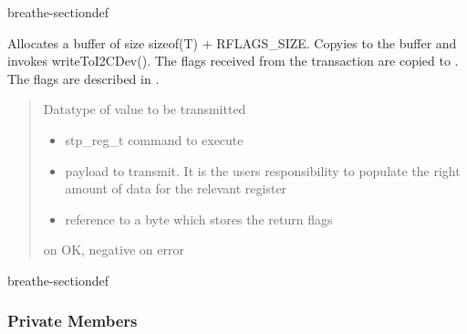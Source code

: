 \documentclass[letterpaper,10pt,english]{sphinxmanual}
\begin{document}
\begin{fulllineitems}
\begin{sphinxuseclass}{breathe-sectiondef}
\begin{fulllineitems}
\sphinxAtStartPar
Allocates a buffer of size sizeof(T) + RFLAGS\_SIZE. Copyies  to the buffer and invokes writeToI2CDev(). The flags received from the transaction are copied to . The flags are described in {\hyperref[\detokenize{code/bioscara_hardware_drivers/index:classbioscara__hardware__drivers_1_1Joint_1a81a8e4841ae03d04498d2f6ef3c08d82}]{}}.
\begin{quote}\begin{description}
\sphinxAtStartPar
{} \textendash{} Datatype of value to be transmitted 

\begin{itemize}
\item {} 
\sphinxAtStartPar
{} \textendash{} stp\_reg\_t command to execute 

\item {} 
\sphinxAtStartPar
{} \textendash{} payload to transmit. It is the users responsibility to populate the right amount of data for the relevant register 

\item {} 
\sphinxAtStartPar
{} \textendash{} reference to a byte which stores the return flags 

\end{itemize}

 on OK, negative on error 

\end{description}\end{quote}

\end{fulllineitems}


\end{sphinxuseclass}
\begin{sphinxuseclass}{breathe-sectiondef}\subsubsection*{Private Members}


\end{sphinxuseclass}
\end{fulllineitems}
\end{document}
